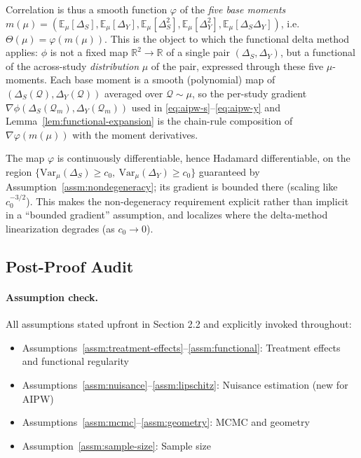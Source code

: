 Correlation is thus a smooth function $\varphi$ of the \emph{five base moments} $m(\mu) = (\mathbb{E}_\mu[\Delta_S], \mathbb{E}_\mu[\Delta_Y], \mathbb{E}_\mu[\Delta_S^2], \mathbb{E}_\mu[\Delta_Y^2], \mathbb{E}_\mu[\Delta_S \Delta_Y])$, i.e. $\Theta(\mu) = \varphi(m(\mu))$. This is the object to which the functional delta method applies: $\phi$ is not a fixed map $\mathbb{R}^2 \to \mathbb{R}$ of a single pair $(\Delta_S, \Delta_Y)$, but a functional of the across-study \emph{distribution} $\mu$ of the pair, expressed through these five $\mu$-moments. Each base moment is a smooth (polynomial) map of $(\Delta_S(\mathcal{Q}), \Delta_Y(\mathcal{Q}))$ averaged over $\mathcal{Q} \sim \mu$, so the per-study gradient $\nabla\phi(\Delta_S(\mathcal{Q}_m), \Delta_Y(\mathcal{Q}_m))$ used in \eqref{eq:aipw-s}--\eqref{eq:aipw-y} and Lemma~\ref{lem:functional-expansion} is the chain-rule composition of $\nabla\varphi(m(\mu))$ with the moment derivatives.

\begin{remark}
The map $\varphi$ is continuously differentiable, hence Hadamard differentiable, on the region $\{\mathrm{Var}_\mu(\Delta_S) \geq c_0,\ \mathrm{Var}_\mu(\Delta_Y) \geq c_0\}$ guaranteed by Assumption~\ref{assm:nondegeneracy}; its gradient is bounded there (scaling like $c_0^{-3/2}$). This makes the non-degeneracy requirement explicit rather than implicit in a ``bounded gradient'' assumption, and localizes where the delta-method linearization degrades (as $c_0 \to 0$).
\end{remark}

\subsection{Post-Proof Audit}

\paragraph{Assumption check.}
All assumptions stated upfront in Section 2.2 and explicitly invoked throughout:
\begin{itemize}
\item Assumptions~\ref{assm:treatment-effects}--\ref{assm:functional}: Treatment effects and functional regularity
\item Assumptions~\ref{assm:nuisance}--\ref{assm:lipschitz}: Nuisance estimation (new for AIPW)
\item Assumptions~\ref{assm:mcmc}--\ref{assm:geometry}: MCMC and geometry
\item Assumption~\ref{assm:sample-size}: Sample size
\end{itemize}

